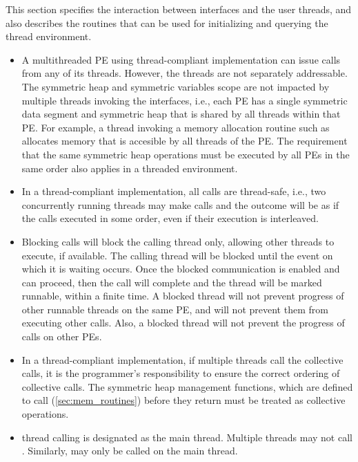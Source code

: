 This section specifies the interaction between \openshmem{} interfaces and the
user threads, and also describes the routines that can be used for initializing and 
querying the thread environment.
 

\begin{itemize}

\item
A multithreaded \openshmem{} \ac{PE} using thread-compliant implementation can issue
\openshmem{} calls from  any of its threads. However, the threads
are not separately addressable. The symmetric heap and symmetric variables scope
are not impacted by multiple threads invoking the
\openshmem{} interfaces, i.e., 
each \ac{PE} has a single symmetric data segment and symmetric heap that is shared by
all threads within that \ac{PE}.  For example, a thread invoking a memory allocation
routine such as  
allocates memory that is accesible by all threads of the \ac{PE}. 
The requirement that the same symmetric heap operations must
be executed by all \acp{PE} in the same order also applies in a threaded
environment. 
                                    	
\item In a thread-compliant implementation, 
all \openshmem{} calls are thread-safe, i.e., two concurrently running threads
may make \openshmem{} calls and the outcome will be as if the calls executed in
some order, even if their execution is interleaved.

\item Blocking \openshmem{} calls will block the calling thread only, allowing
other threads to execute, if available. The calling thread will be blocked until the
event on which it is waiting occurs. Once the blocked communication is enabled
and can proceed, then the call will complete and the thread will be marked
runnable, within a finite time. A blocked thread will not prevent progress of
other runnable threads on the same \ac{PE}, and will not prevent them from
executing other \openshmem{} calls. Also, a blocked thread will not prevent the
progress of \openshmem{} calls on other \acp{PE}. 
 
\item
In a thread-compliant implementation, if multiple threads call the collective
calls, it is the programmer's responsibility to ensure the correct ordering of
collective calls.  The symmetric heap management functions, which are defined to call
(\ref{sec:mem_routines}) before they return 
must be treated as collective operations.

\item
\openshmem{} thread calling  is designated as the main
thread. Multiple threads may not call . Similarly,
 may only be called on the main thread.

\end{itemize} 
 
